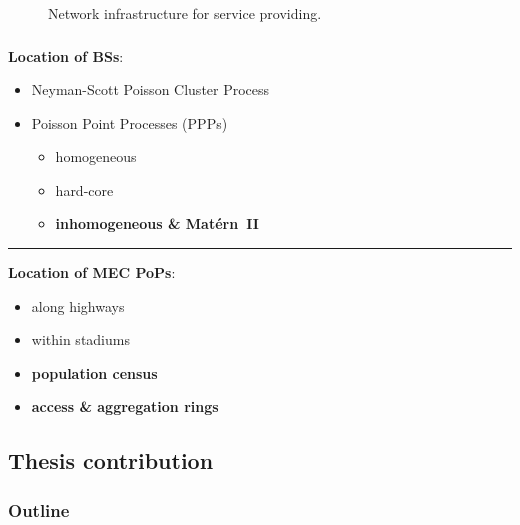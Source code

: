 \documentclass[aspectratio=169]{beamer}
\begin{document}
\begin{frame}
{\begin{minipage}{0.5\textwidth}
\begin{figure}
                \caption{Network infrastructure for service providing.}
                \label{fig:big-infra}
            \end{figure}
        \end{minipage}
    }
\end{frame}





\begin{frame}
    \frametitle{\secname}
    \framesubtitle{\subsecname}
    \textbf{Location of BSs}:
    \begin{itemize}
        \item Neyman-Scott Poisson Cluster Process~\cite{vinay-moller-interference}
        \item Poisson Point Processes (PPPs)~\cite{stochastic-martina}
            \begin{itemize}
                \item homogeneous~\cite{cran-vinay-moller,hetnets-cor}
                \item hard-core~\cite{hard-core-cover} \pause
                \item {\color{red}\textbf{inhomogeneous \& Matérn~II}}
            \end{itemize}
    \end{itemize}
    \pause
    \vfill
    \hrule
    \vfill
    \textbf{Location of MEC PoPs}:
    \begin{itemize}
        \item along highways~\cite{usa-mec}
        \item within stadiums~\cite{tokio-olympics} \pause
        \item {\color{red}\textbf{population census}}
        \item {\color{red}\textbf{access \& aggregation rings}}
    \end{itemize}

\end{frame}


\subsection{Thesis contribution}
\begin{frame}
    \frametitle{Outline}
    \tableofcontents[subsectionstyle=show/shaded/hide,sectionstyle=show/shaded]
\end{frame}
\end{document}
